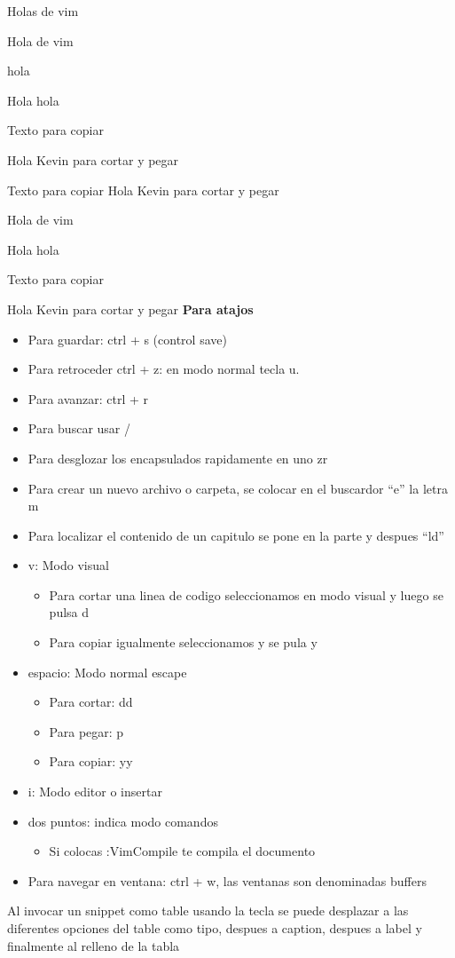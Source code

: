 \documentclass{article}
\begin{document}
 
\begin{center}
  Holas de vim
\end{center}

Hola de vim

hola

Hola hola

Texto para copiar

Hola Kevin para cortar y pegar

Texto para copiar
Hola Kevin para cortar y pegar

\begin{center}
  Hola de vim
\end{center}

Hola hola

Texto para copiar

Hola Kevin para cortar y pegar
\textbf{Para atajos}

\begin{itemize}
  \item Para guardar: ctrl + s (control save)
  \item Para retroceder ctrl + z: en modo normal tecla u.
  \item Para avanzar: ctrl + r
  \item Para buscar usar /
  \item Para desglozar los encapsulados rapidamente en uno zr
  \item Para crear un nuevo archivo o carpeta, se colocar en el buscardor ``e'' la letra m
  \item Para localizar el contenido de un capitulo se pone en la parte y despues ``ld''
  \item v: Modo visual
  \begin{itemize}
    \item Para cortar una linea de codigo seleccionamos en modo visual y luego se pulsa d
    \item Para copiar igualmente seleccionamos y se pula y
  \end{itemize}
  \item espacio: Modo normal escape
    \begin{itemize}
      \item Para cortar: dd
      \item Para pegar: p
      \item Para copiar: yy
    \end{itemize}
  \item i: Modo editor o insertar
  \item dos puntos: indica modo comandos
   \begin{itemize}
     \item Si colocas :VimCompile te compila el documento
   \end{itemize}
 \item Para navegar en ventana: ctrl + w, las ventanas son denominadas buffers

\end{itemize}

Al invocar un snippet como table usando la tecla se puede desplazar a las diferentes opciones del table como tipo, despues a caption, despues a label y finalmente al relleno de la tabla
\end{document}
